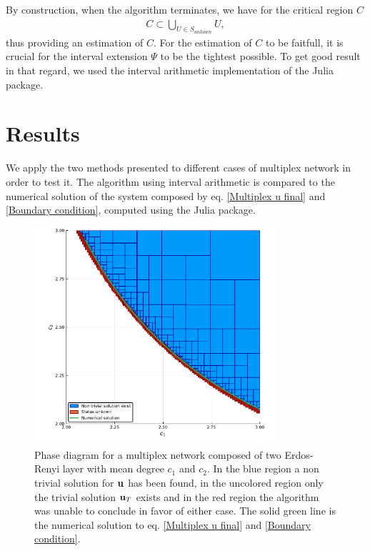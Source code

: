 \documentclass[
11pt, %
english, %
singlespacing, %
liststotoc, %
headsepline, %
]{MastersDoctoralThesis} %
\begin{document}
By construction, when the algorithm terminates, we have for the critical region $C$
\begin{align}
	C \subset \bigcup_{U \in S_{unkown}} U,
\end{align}
thus providing an estimation of $C$. For the estimation of $C$ to be faitfull, it is crucial for the interval extension $\Psi$ to be the tightest possible. To get good result in that regard, we used the interval arithmetic implementation of the  Julia package\missingref{}.

\section{Results}

We apply the two methods presented to different cases of multiplex network in order to test it. The algorithm using interval arithmetic is compared to the numerical solution of the system composed by eq. \eqref{Multiplex u final} and \eqref{Boundary condition}, computed using the  Julia package.


\begin{figure}
	\includegraphics[width=0.8\textwidth]{two_layers_erdos_renyi_boundary.pdf}
	\caption{Phase diagram for a multiplex network composed of two Erdos-Renyi layer with mean degree $c_1$ and $c_2$. In the blue region a non trivial solution for $\boldsymbol{\mathrm{u}}$ has been found, in the uncolored region only the trivial solution $\boldsymbol{\mathrm{u}}_T$ exists and in the red region the algorithm was unable to conclude in favor of either case. The solid green line is the numerical solution to eq. \eqref{Multiplex u final} and \eqref{Boundary condition}.}
	\label{Figure: Regions and boundary}
\end{figure}
\end{document}

